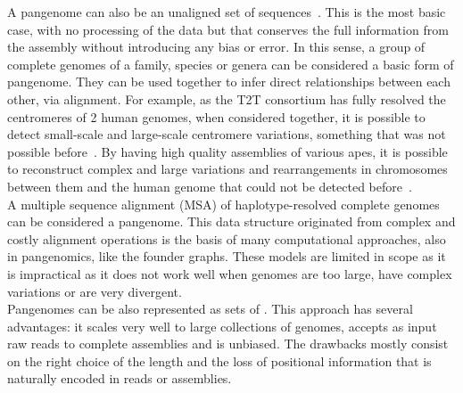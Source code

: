 A pangenome can also be an unaligned set of sequences~\cite{cpmarshall}. This is the most basic case, with no processing of the data but that conserves the full information from the assembly without introducing any bias or error. In this sense, a group of complete genomes of a family, species or genera can be considered a basic form of pangenome. They can be used together to infer direct relationships between each other, via alignment. For example, as the T2T consortium has fully resolved the centromeres of 2 human genomes, when considered together, it is possible to detect small-scale and large-scale centromere variations, something that was not possible before~\cite{centromeres_eichler}. By having high quality assemblies of various apes, it is possible to reconstruct complex and large variations and rearrangements in chromosomes between them and the human genome that could not be detected before~\cite{apes_genomes}.\\
A multiple sequence alignment (MSA) of haplotype-resolved complete genomes can be considered a pangenome. This data structure originated from complex and costly alignment operations is the basis of many computational approaches, also in pangenomics, like the founder graphs. These models are limited in scope as it is impractical as it does not work well when genomes are too large, have complex variations or are very divergent.\\
Pangenomes can be also represented as sets of \kmers. This approach has several advantages: it scales very well to large collections of genomes, accepts as input raw reads to complete assemblies and is unbiased. The drawbacks mostly consist on the right choice of the \kmer length and the loss of positional information that is naturally encoded in reads or assemblies.

